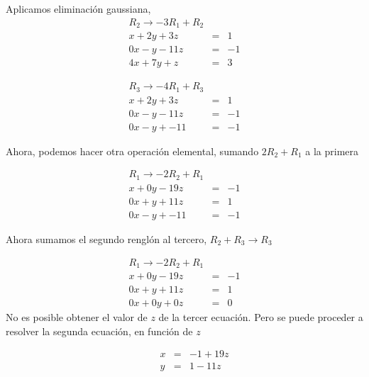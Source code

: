 \documentclass[
]{article}
\begin{document}
Aplicamos eliminación gaussiana, \[
\begin{array}{ccc}
  R_2 \rightarrow -3R_1 + R_2 & & \\
  x + 2y +3z  & = &  1 \\
  0x  -y -11z & = & -1 \\
  4x +7y +z   & = & 3
\end{array}
\]

\[
\begin{array}{ccc}
  R_3 \rightarrow -4R_1 + R_3 & & \\
  x + 2y +3z  & = &  1 \\
  0x  -y -11z & = & -1 \\
  0x -y +-11  & = & -1\end{array}
\]

Ahora, podemos hacer otra operación elemental, sumando \(2R_2 + R_1\) a
la primera

\[
\begin{array}{ccc}
  R_1 \rightarrow -2R_2 + R_1 & & \\
  x + 0y -19z  & = &  -1 \\
  0x + y +11z  & = &  1 \\
  0x -y  +-11  & = & -1\end{array}
\]

Ahora sumamos el segundo renglón al tercero, \(R_2+R_3\rightarrow R_3\)

\[
\begin{array}{ccc}
  R_1 \rightarrow -2R_2 + R_1 & & \\
  x + 0y -19z  & = &  -1 \\
  0x + y +11z  & = &  1 \\
  0x + 0y +0z  & = & 0
\end{array}
\] No es posible obtener el valor de \(z\) de la tercer ecuación. Pero
se puede proceder a resolver la segunda ecuación, en función de \(z\)

\[
\begin{array}{ccc}
  \quad\quad  x & = &  -1 + 19z \\
  \quad\quad  y & = &  1 - 11z
  \end{array}
\]
\end{document}
